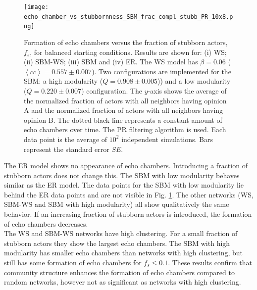 \documentclass[11 pt , letterpaper , twoside , openright]{book}
\begin{document}
\begin{figure}[H]
	\texttt{[image: echo\_chamber\_vs\_stubbornness\_SBM\_frac\_compl\_stubb\_PR\_10x8.png]}
	\captionsetup{format=plain}
	\caption[Formation of echo chambers versus fraction of stubborn actors for the PR filtering algorithm and balanced starting conditions.]{Formation of echo chambers versus the fraction of stubborn actors, $f_s$, for balanced starting conditions. Results are shown for: (i) WS; (ii) SBM-WS; (iii) SBM and (iv) ER. The WS model has $\beta = 0.06$ ($\left<cc\right> = 0.557 \pm 0.007$). Two configurations are implemented for the SBM: a high modularity ($Q = 0.908 \pm 0.005$)) and a low modularity ($Q = 0.220 \pm 0.007$) configuration. The $y$-axis shows the average of the normalized fraction of actors with all neighbors having opinion A and the normalized fraction of actors with all neighbors having opinion B. The dotted black line represents a constant amount of echo chambers over time. The PR filtering algorithm is used. Each data point is the average of $10^2$ independent simulations. Bars represent the standard error $SE$.}
\label{echo_vs_frac_complStubb}
\end{figure}
\noindent
The ER model shows no appearance of echo chambers. Introducing a fraction of stubborn actors does not change this. The SBM with low modularity behaves similar as the ER model. The data points for the SBM with low modularity lie behind the ER data points and are not visible in Fig. \ref{echo_vs_frac_complStubb}. The other networks (WS, SBM-WS and SBM with high modularity) all show qualitatively the same behavior. If an increasing fraction of stubborn actors is introduced, the formation of echo chambers decreases.\\
\newline
The WS and SBM-WS networks have high clustering. For a small fraction of stubborn actors they show the largest echo chambers. The SBM with high modularity has smaller echo chambers than networks with high clustering, but still has some formation of echo chambers for $f_s \leqslant 0.1$. These results confirm that community structure enhances the formation of echo chambers compared to random networks, however not as significant as networks with high clustering.
\end{document}
